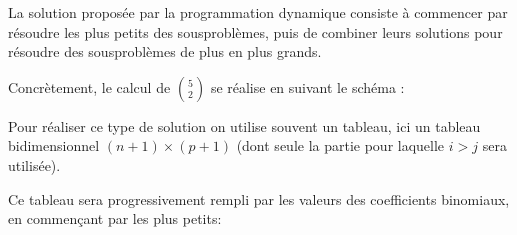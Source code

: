 \documentclass[letterpaper,10pt,english]{jupyterBook}
\begin{document}
\sphinxAtStartPar
La solution proposée par la programmation dynamique consiste à commencer par résoudre les plus petits des
sous\sphinxhyphen{}problèmes, puis de combiner leurs solutions pour résoudre des sous\sphinxhyphen{}problèmes de plus en plus grands.

\sphinxAtStartPar
Concrètement, le calcul de \(\binom{5 }{2}\) se réalise en suivant le schéma :

\sphinxAtStartPar
Pour réaliser ce type de solution on utilise souvent un tableau, ici un tableau bi\sphinxhyphen{}dimensionnel \((n + 1) \times (p + 1)\) (dont seule la partie pour laquelle \(i > j\) sera utilisée).

\sphinxAtStartPar
Ce tableau sera progressivement rempli par les valeurs des coefficients binomiaux, en commençant par les plus petits: 
\end{document}
